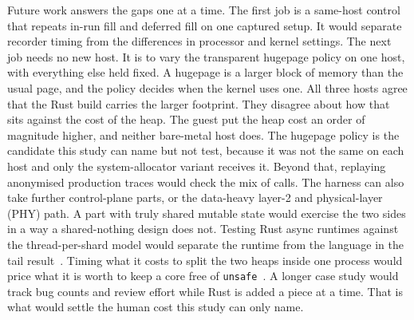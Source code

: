 \documentclass[english,oneside,a4paper,censored,csm,software-track-2020]{HYthesisML}
\begin{document}
Future work answers the gaps one at a time.
The first job is a same-host control that repeats in-run fill and deferred fill on one captured setup.
It would separate recorder timing from the differences in processor and kernel settings.
The next job needs no new host.
It is to vary the transparent hugepage policy on one host, with everything else held fixed.
A hugepage is a larger block of memory than the usual page, and the policy decides when the kernel uses one.
All three hosts agree that the Rust build carries the larger footprint.
They disagree about how that sits against the cost of the heap.
The guest put the heap cost an order of magnitude higher, and neither bare-metal host does.
The hugepage policy is the candidate this study can name but not test, because it was not the same on each host and only the system-allocator variant receives it.
Beyond that, replaying anonymised production traces would check the mix of calls.
The harness can also take further control-plane parts, or the data-heavy layer-2 and physical-layer (PHY) path.
A part with truly shared mutable state would exercise the two sides in a way a shared-nothing design does not.
Testing Rust async runtimes against the thread-per-shard model would separate the runtime from the language in the tail result~\cite{arvidsson2025async}.
Timing what it costs to split the two heaps inside one process would price what it is worth to keep a core free of \texttt{unsafe}~\cite{rivera2021galeed,kirth2022pkrusafe}.
A longer case study would track bug counts and review effort while Rust is added a piece at a time.
That is what would settle the human cost this study can only name.




\cleardoublepage %

\printbibliography
\end{document}
